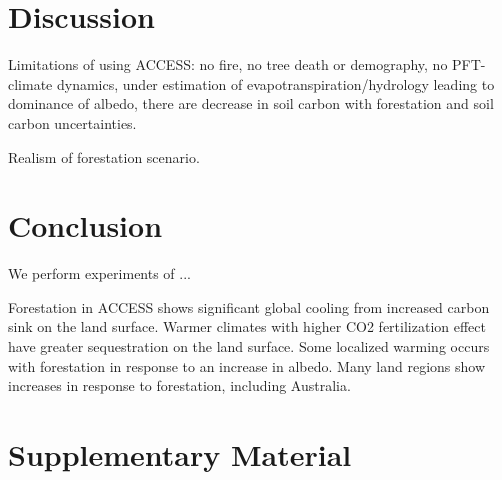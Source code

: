 \documentclass[]{article}
\begin{document}
\section{Discussion}

Limitations of using ACCESS: no fire, no tree death or demography, no PFT-climate dynamics, under estimation of evapotranspiration/hydrology leading to dominance of albedo, there are decrease in soil carbon with forestation and soil carbon uncertainties.

Realism of forestation scenario.

\section{Conclusion}

We perform experiments of ...

Forestation in ACCESS shows significant global cooling from increased carbon sink on the land surface.
Warmer climates with higher CO2 fertilization effect have greater sequestration on the land surface.
Some localized warming occurs with forestation in response to an increase in albedo. 
Many land regions show increases in response to forestation, including Australia.

\printbibliography

\section{Supplementary Material}
\setcounter{figure}{0}
\end{document}
